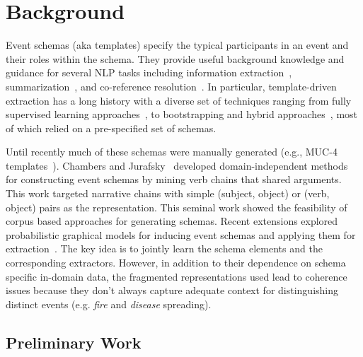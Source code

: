 \section{Background}
Event schemas (aka templates) specify the typical participants in an event and their roles within the schema. They provide useful background knowledge and guidance for several NLP tasks including information extraction~\cite{krupka-muc3,marsh-98}, summarization~\cite{owczarzak-tac10}, and co-reference resolution~\cite{irwin-cnll11}. In particular, template-driven extraction has a long history with a diverse set of techniques ranging from fully supervised learning approaches~\cite{chinchor1993evaluating,freitag1998toward,patwardhan-emnlp09}, to bootstrapping and hybrid approaches~\cite{surdeanu2006hybrid,huang2012bootstrapped}, most of which relied on a pre-specified set of schemas.

Until recently much of these schemas were manually generated (e.g., MUC-4 templates~\cite{sundheim1992overview}). Chambers and Jurafsky~\cite{chambers-acl08,chambers-acl09,chambers-lrec10} developed domain-independent methods for constructing event schemas by mining verb chains that shared arguments. This work targeted narrative chains with simple (subject, object) or (verb, object) pairs as the representation. This seminal work showed the feasibility of corpus based approaches for generating schemas. Recent extensions explored probabilistic graphical models for inducing event schemas and applying them for extraction~\cite{chambers2013event,poon-naacl13}. The key idea is to jointly learn the schema elements and the corresponding extractors. However, in addition to their dependence on schema specific in-domain data, the fragmented representations used lead to coherence issues because they don't always capture adequate context for distinguishing distinct events (e.g. {\em fire} and {\em disease} spreading). 

\subsection{Preliminary Work}

